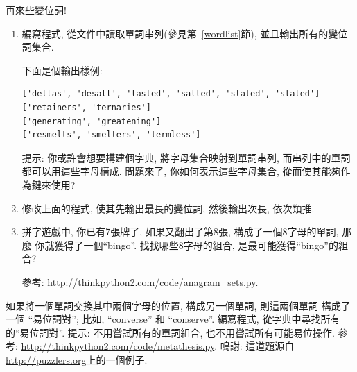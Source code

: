 \documentclass[10pt]{book}
\begin{document}
\begin{exercise}
\label{anagrams}

再來些變位詞!

\begin{enumerate}

\item 編寫程式, 從文件中讀取單詞串列(參見第~\ref{wordlist}節), 
並且輸出所有的變位詞集合. 

下面是個輸出樣例:

\begin{verbatim}
['deltas', 'desalt', 'lasted', 'salted', 'slated', 'staled']
['retainers', 'ternaries']
['generating', 'greatening']
['resmelts', 'smelters', 'termless']
\end{verbatim}
%
提示: 你或許會想要構建個字典, 將字母集合映射到單詞串列, 
而串列中的單詞都可以用這些字母構成. 問題來了, 你如何表示這些字母集合, 
從而使其能夠作為鍵來使用?

\item 修改上面的程式, 使其先輸出最長的變位詞, 然後輸出次長, 依次類推. 

\item 拼字遊戲中, 你已有7張牌了, 如果又翻出了第8張, 構成了一個8字母的單詞, 那麼
你就獲得了一個``bingo''. 找找哪些8字母的組合, 是最可能獲得``bingo''的組合?


參考: \url{http://thinkpython2.com/code/anagram_sets.py}.

\end{enumerate}
\end{exercise}

\begin{exercise}
如果將一個單詞交換其中兩個字母的位置, 構成另一個單詞, 則這兩個單詞
構成了一個 ``易位詞對''; 比如, ``converse'' 和 ``conserve''.  
編寫程式, 從字典中尋找所有的``易位詞對''.
提示: 不用嘗試所有的單詞組合, 也不用嘗試所有可能易位操作. 
參考:
\url{http://thinkpython2.com/code/metathesis.py}.  
鳴謝: 這道題源自\url{http://puzzlers.org}上的一個例子. 
\end{exercise}
\end{document}
